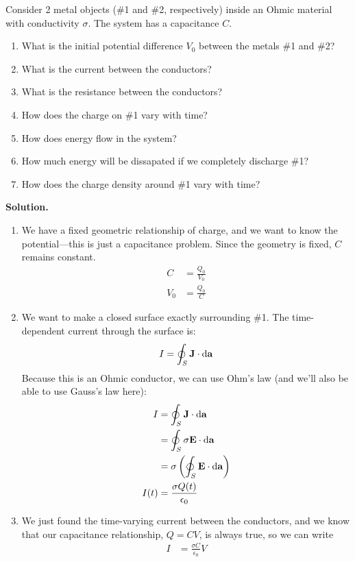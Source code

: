 \documentclass[a4paper]{article}
\begin{document}
\begin{eg}
	Consider 2 metal objects (\#1 and \#2, respectively)
	inside an Ohmic material with conductivity
	$\sigma$. The system has a capacitance $C$.
	\begin{enumerate}
		\item What is the initial potential difference $V_0$ between
			the metals \#1 and \#2?
		\item What is the current between the conductors?
		\item What is the resistance between the conductors?
		\item How does the charge on \#1 vary with time?
		\item How does energy flow in the system?
		\item How much energy will be dissapated if we completely
			discharge \#1?
		\item How does the charge density around \#1 vary with time?
	\end{enumerate}
	\textbf{Solution.}
	\begin{enumerate}
		\item We have a fixed geometric relationship of charge, and we
			want to know the potential---this is just a
			capacitance problem. Since the geometry is fixed,
			$C$ remains constant.
			\begin{align*}
				C &= \frac{Q_0}{V_0}\\
				V_0 &= \frac{Q_0}{C}
			\end{align*}
		\item We want to make a closed surface exactly surrounding
			\#1. The time-dependent current through the surface
			is:
			\[ I = \oint_S \boldsymbol{\mathbf{J}} \cdot \mathrm{d}\boldsymbol{\mathbf{a}} \]
			Because this is an Ohmic conductor, we can use
			Ohm's law (and we'll also be able to use
			Gauss's law here):
			\begin{align*}
				I &= \oint_S \boldsymbol{\mathbf{J}} \cdot \mathrm{d}\boldsymbol{\mathbf{a}}\\
				  &= \oint_S \sigma \boldsymbol{\mathbf{E}} \cdot \mathrm{d}\boldsymbol{\mathbf{a}}\\
				  &= \sigma\left(\oint_S\boldsymbol{\mathbf{E}}\cdot\mathrm{d}\boldsymbol{\mathbf{a}}
					\right)\\
				I(t) &= \frac{\sigma Q(t)}{\epsilon_0}
			\end{align*}
		\item We just found the time-varying current between the
			conductors, and we know that our capacitance
			relationship, $Q=CV$, is always true, so
			we can write
			\begin{align*}
				I &= \frac{\sigma C}{\epsilon_0} V\\

\end{align*}
\end{enumerate}
\end{eg}
\end{document}
